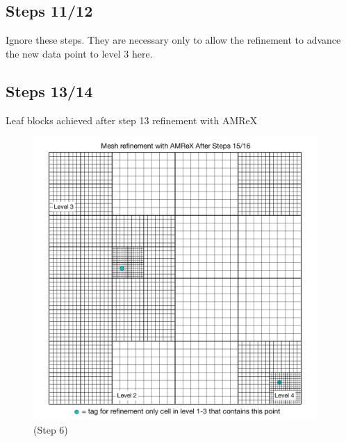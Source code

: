 \documentclass[12pt,letterpaper]{article}
\begin{document}
\newpage
\subsection{Steps 11/12}
Ignore these steps.  They are necessary only to allow the refinement to advance
the new data point to level 3 here.

\subsection{Steps 13/14}
Leaf blocks achieved after step 13 refinement with AMReX
\begin{figure}[!hp]
\begin{center}
\includegraphics[width=4.25in]{TestRefine_Step14_Both.pdf}
\caption{(Step 6) }
\end{center}
\end{figure}
\end{document}
